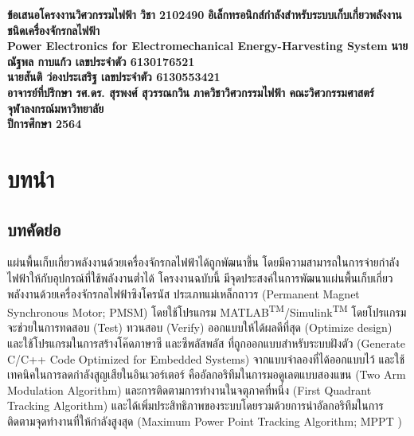 \documentclass[11pt,a4paper]{article}
\begin{document}
\thispagestyle{empty}
\begin{center}
    \doublespacing
    {\LARGE \bf ข้อเสนอโครงงานวิศวกรรมไฟฟ้า วิชา 2102490}
    \vfill
    {
        \LARGE \bf
        อิเล็กทรอนิกส์กำลังสำหรับระบบเก็บเกี่ยวพลังงานชนิดเครื่องจักรกลไฟฟ้า \\[2ex]
        Power Electronics for Electromechanical Energy-Harvesting System
    }
    \vfill
    {\LARGE \bf นายณัฐพล กาบแก้ว เลขประจำตัว 6130176521}\\[2ex]
    {\LARGE \bf นายสันติ ว่องประเสริฐ เลขประจำตัว 6130553421}\\[2ex]
    {\LARGE \bf อาจารย์ที่ปรึกษา รศ.ดร. สุรพงศ์ สุวรรณกวิน}
    \vfill
    {\LARGE \bf ภาควิชาวิศวกรรมไฟฟ้า คณะวิศวกรรมศาสตร์}\\[2ex]
    {\LARGE \bf จุฬาลงกรณ์มหาวิทยาลัย}\\[2ex]
    {\LARGE \bf ปีการศึกษา 2564}
\end{center}

\newpage
\thispagestyle{empty}
\tableofcontents

\newpage
\setcounter{page}{1}
\section{บทนำ}
\subsection{บทคัดย่อ}
แผ่นพื้นเก็บเกี่ยวพลังงานด้วยเครื่องจักรกลไฟฟ้าได้ถูกพัฒนาขึ้น โดยมีความสามารถในการจ่ายกำลังไฟฟ้าให้กับอุปกรณ์ที่ใช้พลังงานต่ำได้ โครงงานฉบับนี้ มีจุดประสงค์ในการพัฒนาแผ่นพื้นเก็บเกี่ยวพลังงานด้วยเครื่องจักรกลไฟฟ้าซิงโครนัส ประเภทแม่เหล็กถาวร (Permanent Magnet Synchronous Motor; PMSM) โดยใช้โปรแกรม MATLAB\textsuperscript{TM}/Simulink\textsuperscript{TM} โดยโปรแกรม จะช่วยในการทดสอบ (Test) ทวนสอบ (Verify) ออกแบบให้ได้ผลดีที่สุด (Optimize design) และใช้โปรแกรมในการสร้างโค๊ดภาษาซี และซีพลัสพลัส ที่ถูกออกแบบสำหรับระบบฝังตัว (Generate C/C++ Code Optimized for Embedded Systems)  จากแบบจำลองที่ได้ออกแบบไว้ และใช้เทคนิคในการลดกำลังสูญเสียในอินเวอร์เตอร์ คืออัลกอริทึมในการมอดูเลตแบบสองแขน (Two Arm Modulation Algorithm) และการติดตามการทำงานในจตุภาคที่หนึ่ง (First Quadrant Tracking Algorithm) และได้เพิ่มประสิทธิภาพของระบบโดยรวมด้วยการนำอัลกอริทึมในการติดตามจุดทำงานที่ให้กำลังสูงสุด (Maximum Power Point Tracking Algorithm; MPPT )
\end{document}
